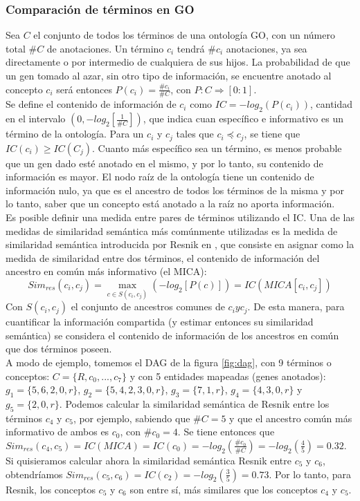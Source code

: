 \subsubsection{Comparación de términos en GO}
Sea $C$ el conjunto de todos los términos de una ontología GO, con un número total $\#C$ de anotaciones. Un término $c_i$ tendrá $\#c_i$ anotaciones, ya sea directamente o por intermedio de cualquiera de sus hijos. La probabilidad de que un gen tomado al azar, sin otro tipo de información, se encuentre anotado al concepto $c_i$ será entonces $P(c_i) = \frac{\#c_i}{\#C}$, con $P:C\Rightarrow [0:1]$.\\
Se define el contenido de información de $c_i$ como $IC = -log_2(P(c_i))$, cantidad en el intervalo $(0, -log_2[\frac{1}{\#C}])$, que indica cuan específico e informativo es un término de la ontología. Para un $c_i$ y $c_j$ tales que $c_i \preceq c_j$, se tiene que $IC(c_i) \geq IC(C_j)$. Cuanto más específico sea un término, es menos probable que un gen dado esté anotado en el mismo, y por lo tanto, su contenido de información es mayor. El nodo raíz de la ontología tiene un contenido de información nulo, ya que es el ancestro de todos los términos de la misma y por lo tanto, saber que un concepto está anotado a la raíz no aporta información.\\
Es posible definir una medida entre pares de términos utilizando el IC. Una de las medidas de similaridad semántica más comúnmente utilizadas es la medida de similaridad semántica introducida por Resnik en \cite{Resnik1995}, que consiste en asignar como la medida de similaridad entre dos términos, el contenido de información del ancestro en común más informativo (el MICA):
\begin{equation}
	Sim_{res}(c_i, c_j) = \max\limits_{c \in S(c_i, c_j)}(-log_2[P(c)]) = IC(MICA[c_i, c_j])
\end{equation}
Con $S(c_i, c_j)$ el conjunto de ancestros comunes de $c_i y c_j$. De esta manera, para cuantificar la información compartida (y estimar entonces su similaridad semántica) se considera el contenido de información de los ancestros en común que dos términos poseen.\\
A modo de ejemplo, tomemos el DAG de la figura \ref{fig:dag}, con 9 términos o conceptos: $C=\{R, c_0,...,c_7\}$ y con 5 entidades mapeadas (genes anotados): $g_1=\{5, 6, 2, 0, r\}$, $g_2=\{5, 4, 2, 3, 0, r\}$, $g_3=\{7, 1, r\}$, $g_4=\{4, 3, 0, r\}$ y $g_5=\{2, 0, r\}$. Podemos calcular la similaridad semántica de Resnik entre los términos $c_4$ y $c_5$, por ejemplo, sabiendo que $\#C = 5$ y que el ancestro común más informativo de ambos es $c_0$, con $\#c_0=4$. Se tiene entonces que $Sim_{res}(c_4, c_5) = IC(MICA) = IC(c_0) = -log_2(\frac{\#c_0}{\#C}) = -log_2(\frac{4}{5}) = 0.32$. Si quisieramos calcular ahora la similaridad semántica Resnik entre $c_5$ y $c_6$, obtendríamos $Sim_{res}(c_5, c_6) = IC(c_2) = -log_2(\frac{3}{5}) = 0.73$. Por lo tanto, para Resnik, los conceptos $c_5$ y $c_6$ son entre sí, más similares que los conceptos $c_4$ y $c_5$.\\
